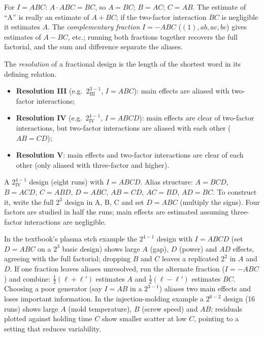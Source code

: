 For $I=ABC$: $A\cdot ABC=BC$, so $A=BC$; $B=AC$; $C=AB$. The estimate of ``A'' is really an estimate of $A+BC$; if the two-factor interaction $BC$ is negligible it estimates $A$. The \emph{complementary fraction} $I=-ABC$ ($(1),ab,ac,bc$) gives estimates of $A-BC$, etc.; running both fractions together recovers the full factorial, and the sum and difference separate the aliases.

\begin{definition}[Resolution]
The \emph{resolution} of a fractional design is the length of the shortest word in its defining relation.
\begin{itemize}
  \item \textbf{Resolution III} (e.g.\ $2^{3-1}_{\mathrm{III}}$, $I=ABC$): main effects are aliased with two-factor interactions;
  \item \textbf{Resolution IV} (e.g.\ $2^{4-1}_{\mathrm{IV}}$, $I=ABCD$): main effects are clear of two-factor interactions, but two-factor interactions are aliased with each other ($AB=CD$);
  \item \textbf{Resolution V}: main effects and two-factor interactions are clear of each other (only aliased with three-factor and higher).
\end{itemize}
\end{definition}

\begin{example}
A $2^{4-1}_{\mathrm{IV}}$ design (eight runs) with $I=ABCD$. Alias structure: $A=BCD$, $B=ACD$, $C=ABD$, $D=ABC$, $AB=CD$, $AC=BD$, $AD=BC$. To construct it, write the full $2^3$ design in A, B, C and set $D=ABC$ (multiply the signs). Four factors are studied in half the runs; main effects are estimated assuming three-factor interactions are negligible.
\end{example}

In the textbook's plasma etch example the $2^{4-1}$ design with $I=ABCD$ (set $D=ABC$ on a $2^3$ basic design) shows large $A$ (gap), $D$ (power) and $AD$ effects, agreeing with the full factorial; dropping $B$ and $C$ leaves a replicated $2^2$ in $A$ and $D$. If one fraction leaves aliases unresolved, run the alternate fraction ($I=-ABC$) and combine: $\tfrac12(\ell+\ell')$ estimates $A$ and $\tfrac12(\ell-\ell')$ estimates $BC$. Choosing a poor generator (say $I=AB$ in a $2^{3-1}$) aliases two main effects and loses important information. In the injection-molding example a $2^{6-2}$ design (16 runs) shows large $A$ (mold temperature), $B$ (screw speed) and $AB$; residuals plotted against holding time $C$ show smaller scatter at low $C$, pointing to a setting that reduces variability.

